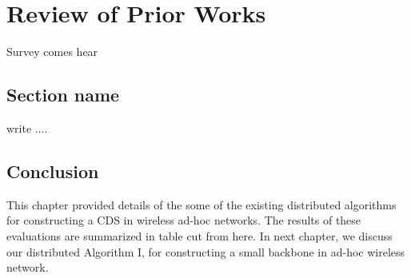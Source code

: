 \chapter{Review of Prior Works}

Survey comes hear

\section{Section name}

write ....

\section{Conclusion}

This chapter provided details of the some of the existing
distributed algorithms for constructing a CDS in wireless ad-hoc
networks. The results of these evaluations are summarized in table
cut from here. In next chapter, we discuss our distributed
Algorithm I, for constructing a small backbone in ad-hoc wireless
network.


